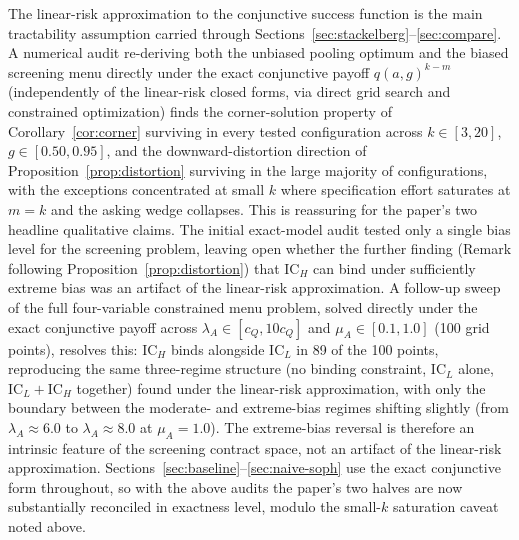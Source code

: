 \documentclass[11pt]{article}
\begin{document}
The linear-risk approximation to the conjunctive success function is the main
tractability assumption carried through Sections~\ref{sec:stackelberg}--\ref{sec:compare}.
A numerical audit re-deriving both the unbiased pooling optimum and the biased
screening menu directly under the exact conjunctive payoff $q(a,g)^{k-m}$
(independently of the linear-risk closed forms, via direct grid search and
constrained optimization) finds the corner-solution property of
Corollary~\ref{cor:corner} surviving in every tested configuration across
$k\in[3,20]$, $g\in[0.50,0.95]$, and the downward-distortion direction of
Proposition~\ref{prop:distortion} surviving in the large majority of
configurations, with the exceptions concentrated at small $k$ where specification
effort saturates at $m=k$ and the asking wedge collapses. This is reassuring for
the paper's two headline qualitative claims. The initial exact-model audit tested
only a single bias level for the screening problem, leaving open whether the
further finding (Remark following Proposition~\ref{prop:distortion}) that
$\text{IC}_H$ can bind under sufficiently extreme bias was an artifact of the
linear-risk approximation. A follow-up sweep of the full four-variable
constrained menu problem, solved directly under the exact conjunctive payoff
across $\lambda_A\in[c_Q,10c_Q]$ and $\mu_A\in[0.1,1.0]$ (100 grid points),
resolves this: $\text{IC}_H$ binds alongside $\text{IC}_L$ in 89 of the 100
points, reproducing the same three-regime structure (no binding constraint,
$\text{IC}_L$ alone, $\text{IC}_L+\text{IC}_H$ together) found under the
linear-risk approximation, with only the boundary between the moderate- and
extreme-bias regimes shifting slightly (from $\lambda_A\approx6.0$ to
$\lambda_A\approx8.0$ at $\mu_A=1.0$). The extreme-bias reversal is therefore an
intrinsic feature of the screening contract space, not an artifact of the
linear-risk approximation. Sections~\ref{sec:baseline}--\ref{sec:naive-soph}
use the exact conjunctive form throughout, so with the above audits the paper's
two halves are now substantially reconciled in exactness level, modulo the
small-$k$ saturation caveat noted above.
\end{document}

